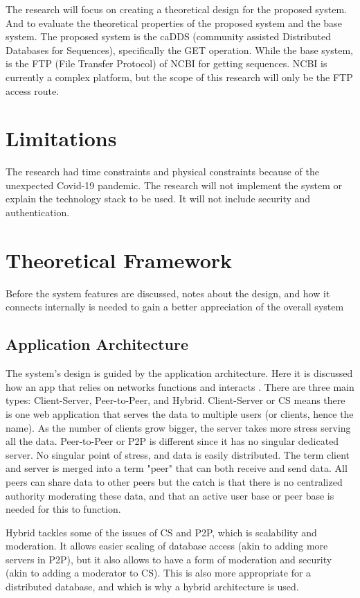 \documentclass[acmsmall]{acmart}
\begin{document}
\begin{multicols}{2}
The research will focus on creating a theoretical design for the proposed system. And to evaluate the theoretical properties of the proposed system and the base system. The proposed system is the caDDS (community assisted Distributed Databases for Sequences), specifically the GET operation. While the base system, is the FTP (File Transfer Protocol) of NCBI for getting sequences. NCBI is currently a complex platform, but the scope of this research will only be the FTP access route.


\section{Limitations}
The research had time constraints and physical constraints because of the unexpected Covid-19 pandemic. The research will not implement the system or explain the technology stack to be used. It will not include security and authentication.


\section{Theoretical Framework}
Before the system features are discussed, notes about the design, and how it connects internally is needed to gain a better appreciation of the overall system


\subsection{Application Architecture}
The system's design is guided by the application architecture. Here it is discussed how an app that relies on networks functions and interacts \cite{kurose}. There are three main types: Client-Server, Peer-to-Peer, and Hybrid. Client-Server or CS means there is one web application that serves the data to multiple users (or clients, hence the name). As the number of clients grow bigger, the server takes more stress serving all the data. Peer-to-Peer or P2P is different since it has no singular dedicated server. No singular point of stress, and data is easily distributed. The term client and server is merged into a term "peer" that can both receive and send data. All peers can share data to other peers but the catch is that there is no centralized authority moderating these data, and that an active user base or peer base is needed for this to function.

Hybrid tackles some of the issues of CS and P2P, which is scalability and moderation. It allows easier scaling of database access (akin to adding more servers in P2P), but it also allows to have a form of moderation and security (akin to adding a moderator to CS). This is also more appropriate for a distributed database, and which is why a hybrid architecture is used.


\end{multicols}
\end{document}
